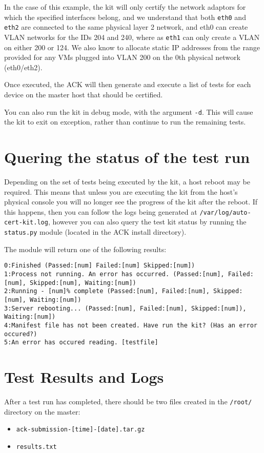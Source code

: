 \documentclass[a4paper,11pt]{article}
\begin{document}
In the case of this example, the kit will only certify the network adaptors for which the specified interfaces belong, and we understand that both \verb=eth0= and \verb=eth2= are connected to the same physical layer 2 network, and eth0 can create VLAN networks for the IDs 204 and 240, where as \verb=eth1= can only create a VLAN on either 200 or 124. We also know to allocate static IP addresses from the range provided for any VMs plugged into VLAN 200 on the 0th physical network (eth0/eth2).

Once executed, the ACK will then generate and execute a list of tests for each device on the master host that should be certified.

You can also run the kit in debug mode, with the argument \verb=-d=. This will cause the kit to exit on exception, rather than continue to run the remaining tests.

\section{Quering the status of the test run}
Depending on the set of tests being executed by the kit, a host reboot may be required. This means that unless you are executing the kit from the host's physical console you will no longer see the progress of the kit after the reboot. If this happens, then you can follow the logs being generated at \verb=/var/log/auto-cert-kit.log=, however you can also query the test kit status by running the \verb=status.py= module (located in the ACK install directory).

The module will return one of the following results:
\begin{verbatim}
0:Finished (Passed:[num] Failed:[num] Skipped:[num])
1:Process not running. An error has occurred. (Passed:[num], Failed:[num], Skipped:[num], Waiting:[num])
2:Running - [num]% complete (Passed:[num], Failed:[num], Skipped:[num], Waiting:[num])
3:Server rebooting... (Passed:[num], Failed:[num], Skipped:[num]), Waiting:[num])
4:Manifest file has not been created. Have run the kit? (Has an error occured?)
5:An error has occured reading. [testfile]
\end{verbatim}

\section{Test Results and Logs}
After a test run has completed, there should be two files created in the \verb=/root/= directory on the master:
\begin{itemize}
\item \verb=ack-submission-[time]-[date].tar.gz=
\item \verb=results.txt=
\end{itemize}
\end{document}
